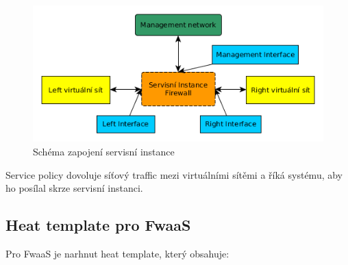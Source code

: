 \begin{figure}[h]
\begin{centering}
\includegraphics[scale=0.63]{images/service_instance}
\par\end{centering}
\caption{Schéma zapojení servisní instance\label{fig:service_instance}}
\end{figure}


Service policy dovoluje síťový traffic mezi virtuálními sítěmi a říká systému, aby ho posílal skrze servisní instanci.


\subsection{Heat template pro FwaaS}

Pro FwaaS je narhnut heat template, který obsahuje:

